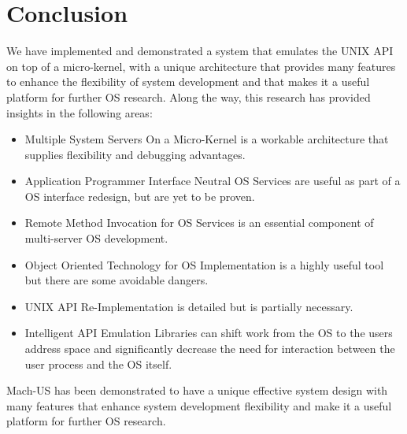 \section{Conclusion}
We have implemented and demonstrated a system that emulates the UNIX
API on top of a micro-kernel, with a unique architecture that provides
many features to enhance the flexibility of system development and
that makes it a useful platform for further OS research. Along the way,
this research has provided insights in the following areas:
\begin{itemize}
\item{Multiple System Servers On a Micro-Kernel} is a workable architecture
that supplies flexibility and debugging advantages.
\item{Application Programmer Interface Neutral OS Services} are useful as
part of a OS interface redesign, but are yet to be proven.
\item{Remote Method Invocation for OS Services} is an essential component
of multi-server OS development.
\item{Object Oriented Technology for OS Implementation} is a highly useful tool
but there are some avoidable dangers.
\item{UNIX API Re-Implementation} is detailed but is partially
necessary.
\item{Intelligent API Emulation Libraries} can shift work
from the OS to the users address space and significantly decrease the need
for interaction between the user process and the OS itself.
\end{itemize}

Mach-US has been demonstrated to have a unique
effective system design with many
features that enhance system development flexibility and make it a useful
platform for further OS research.

